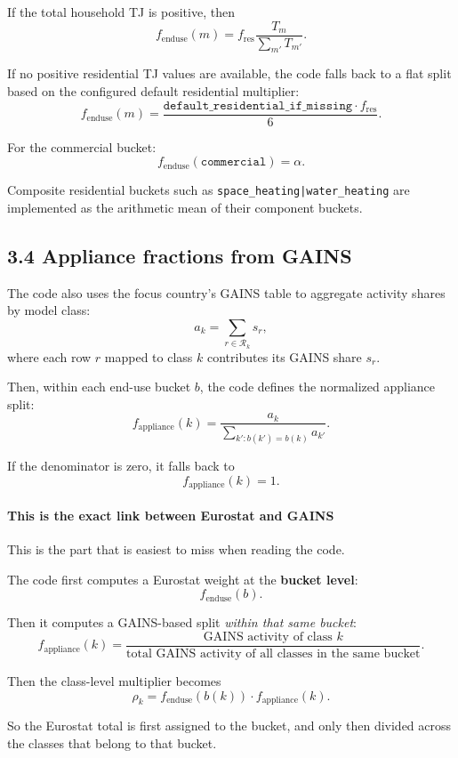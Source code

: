 \documentclass[11pt,a4paper]{article}
\begin{document}
If the total household TJ is positive, then
\[
f_{\mathrm{enduse}}(m) = f_{\mathrm{res}} \frac{T_m}{\sum_{m'} T_{m'}}.
\]

If no positive residential TJ values are available, the code falls back to a flat
split based on the configured default residential multiplier:
\[
f_{\mathrm{enduse}}(m) =
\frac{\texttt{default\_residential\_if\_missing} \cdot f_{\mathrm{res}}}{6}.
\]

For the commercial bucket:
\[
f_{\mathrm{enduse}}(\texttt{commercial}) = \alpha.
\]

Composite residential buckets such as
\texttt{space\_heating|water\_heating} are implemented as the arithmetic mean of
their component buckets.

\subsection{3.4 Appliance fractions from GAINS}

The code also uses the focus country's GAINS table to aggregate activity shares by
model class:
\[
a_k = \sum_{r \in \mathcal{R}_k} s_r,
\]
where each row $r$ mapped to class $k$ contributes its GAINS share $s_r$.

Then, within each end-use bucket $b$, the code defines the normalized appliance split:
\[
f_{\mathrm{appliance}}(k) =
\frac{a_k}{\sum_{k' : b(k') = b(k)} a_{k'}}.
\]

If the denominator is zero, it falls back to
\[
f_{\mathrm{appliance}}(k) = 1.
\]

\paragraph{This is the exact link between Eurostat and GAINS}
This is the part that is easiest to miss when reading the code.

The code first computes a Eurostat weight at the \textbf{bucket level}:
\[
f_{\mathrm{enduse}}(b).
\]

Then it computes a GAINS-based split \emph{within that same bucket}:
\[
f_{\mathrm{appliance}}(k)
=
\frac{\text{GAINS activity of class }k}
{\text{total GAINS activity of all classes in the same bucket}}.
\]

Then the class-level multiplier becomes
\[
\rho_k = f_{\mathrm{enduse}}(b(k)) \cdot f_{\mathrm{appliance}}(k).
\]

So the Eurostat total is first assigned to the bucket, and only then divided across
the classes that belong to that bucket.
\end{document}
